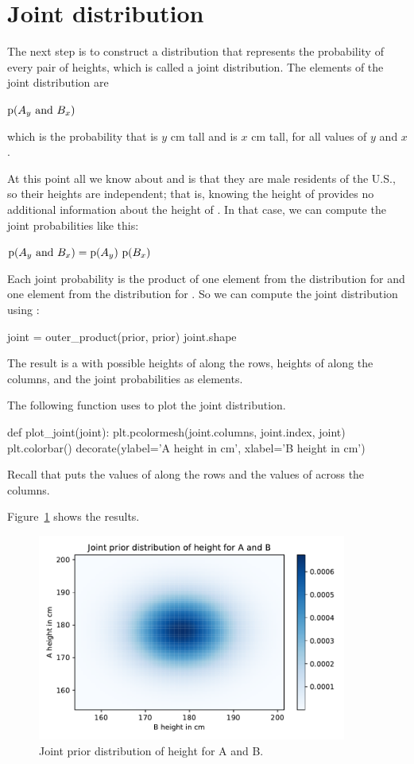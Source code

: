 \documentclass[12pt]{book}
\theoremstyle{exercise}
\begin{document}
\section{Joint distribution}

The next step is to construct a distribution that represents the probability of every pair of heights, which is called a joint distribution.  
The elements of the joint distribution are

$\mathrm{p}(A_y~\mathrm{and}~B_x)$

which is the probability that  is $y$ cm tall and  is $x$ cm tall, for all values of $y$ and $x$.

At this point all we know about  and  is that they are male residents of the U.S., so their heights are independent; that is, knowing the height of  provides no additional information about the height of .
In that case, we can compute the joint probabilities like this:

$\mathrm{p}(A_y~\mathrm{and}~B_x) = \mathrm{p}(A_y)~\mathrm{p}(B_x)$

Each joint probability is the product of one element from the distribution for  and one element from the distribution for .
So we can compute the joint distribution using :

\begin{code}
joint = outer_product(prior, prior)
joint.shape
\end{code}

The result is a  with possible heights of  along the rows, heights of  along the columns, and the joint probabilities as elements.

The following function uses  to plot the joint distribution.

\begin{code}
def plot_joint(joint):
    plt.pcolormesh(joint.columns, joint.index, joint)
    plt.colorbar()
    decorate(ylabel='A height in cm',
             xlabel='B height in cm')
\end{code}

Recall that  puts the values of  along the rows and the values of  across the columns.

Figure~\ref{fig09-01} shows the results.

\begin{figure}
\centerline{\includegraphics[width=4in]{figs/fig09-01.pdf}}
\caption{Joint prior distribution of height for A and B.}
\label{fig09-01}
\end{figure}
\end{document}
